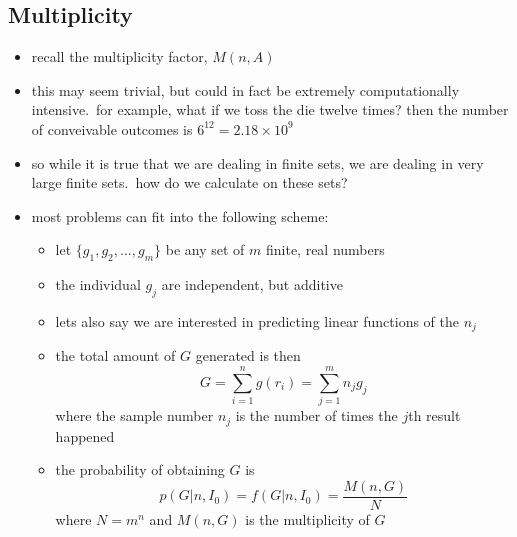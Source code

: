 \documentclass[../jaynes_prob_theory_notes.tex]{subfiles}
\begin{document}
        \subsection{Multiplicity}
            \begin{itemize}
                \item recall the multiplicity factor, $M(n,A)$
                \item this may seem trivial, but could in fact be extremely computationally intensive.\ for example, what if we toss the die twelve times? then the number of conveivable outcomes is $6^{12} = 2.18 \times 10^{9}$
                \item so while it is true that we are dealing in finite sets, we are dealing in very large finite sets.\ how do we calculate on these sets?
                \item most problems can fit into the following scheme:
                    \begin{itemize}
                        \item let $\{g_1, g_2, \ldots, g_m\}$ be any set of $m$ finite, real numbers
                        \item the individual $g_j$ are independent, but additive
                        \item lets also say we are interested in predicting linear functions of the $n_j$
                        \item the total amount of $G$ generated is then
                            \begin{equation*}
                                G = \sum\limits^{n}_{i=1} g\left( r_i \right) = \sum\limits^{m}_{j=1} n_{j}g_{j}
                            \end{equation*}
                            where the sample number $n_j$ is the number of times the $j$th result happened
                        \item the probability of obtaining $G$ is 
                            \begin{equation*}
                                p(G|n, I_0) = f(G|n,I_0) = \frac{M(n,G)}{N}
                            \end{equation*}
                            where $N=m^n$ and $M(n,G)$ is the multiplicity of $G$
                    \end{itemize}
            \end{itemize}
\end{document}
